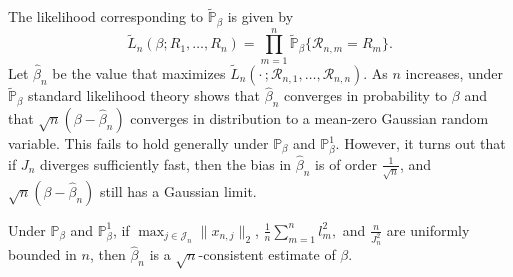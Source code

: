 \documentclass[aoas,preprint]{imsart}
\begin{document}
The likelihood corresponding to $\tilde{\mathbb{P}}_\beta$ is given by
\[
    \tilde{L}_n(\beta ; R_1, \ldots, R_n)
    =
    \prod_{m=1}^{n}
        \tilde{\mathbb{P}}_\beta\big\{ \mathcal{R}_{n,m} = R_m \}.
\]
Let $\hat \beta_n$ be the value that maximizes
\(
    \tilde{L}_n( \cdot\, ; \mathcal{R}_{n,1}, \ldots, \mathcal{R}_{n,n}).
\)
As $n$ increases, under $\tilde{\mathbb{P}}_\beta$ standard likelihood
theory shows that $\hat \beta_n$ converges in probability to $\beta$ and
that $\sqrt{n}(\beta - \hat \beta_n)$ converges in distribution to a
mean-zero Gaussian random variable.  This fails to hold generally under
$\mathbb{P}_\beta$ and $\mathbb{P}^1_\beta$.  However, it turns out
that if $J_n$ diverges sufficiently fast, then the bias in $\hat \beta_n$ is
of order $\tfrac{1}{\sqrt{n}}$, and $\sqrt{n}(\beta - \hat \beta_n)$ still
has a Gaussian limit.

\begin{theorem}
    Under $\mathbb{P}_\beta$ and $\mathbb{P}^1_\beta$,
    if $\max_{j \in \mathcal{J}_n} \|x_{n,j}\|_2$,
    \(
        \frac{1}{n} \sum_{m=1}^n l_m^2,
    \)
    and
    \(
        \frac{n}{J_n^2}
    \)
    are uniformly bounded in $n$, then $\hat \beta_n$ is a
    $\sqrt{n}$-consistent estimate of $\beta$.
\end{theorem}




\end{document}
